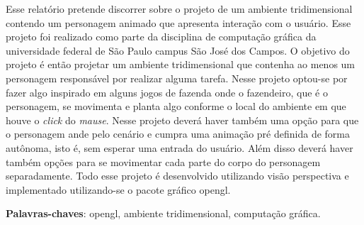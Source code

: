 \documentclass[
	12pt,				%
	openright,			%
	a4paper,			%
	english,			%
	french,				%
	spanish,			%
	brazil,				%
	]{abntex2}
\begin{document}

\frenchspacing 


\imprimircapa

\imprimirfolhaderosto*

\setlength{\absparsep}{18pt} %
\begin{resumo}
Esse relatório pretende discorrer sobre o projeto de um ambiente tridimensional contendo um personagem animado que apresenta interação com o usuário. Esse projeto foi realizado como parte da disciplina de computação gráfica da universidade federal de São Paulo campus São José dos Campos. O objetivo do projeto é então projetar um ambiente tridimensional que contenha ao menos um personagem responsável por realizar alguma tarefa. Nesse projeto optou-se por fazer algo inspirado em alguns jogos de fazenda onde o fazendeiro, que é o personagem, se movimenta e planta algo conforme o local do ambiente em  que houve o \emph{click} do \emph{mause}. Nesse projeto deverá haver também uma opção para que o personagem ande pelo cenário e cumpra uma animação pré definida de forma autônoma, isto é, sem esperar uma entrada do usuário. Além disso deverá haver também opções para se movimentar cada parte do corpo do personagem separadamente. Todo esse projeto é desenvolvido utilizando visão perspectiva e implementado utilizando-se o pacote gráfico opengl. 


 \noindent
 \textbf{Palavras-chaves}: opengl, ambiente tridimensional, computação gráfica.
\end{resumo}



\tableofcontents*


\textual
\end{document}
